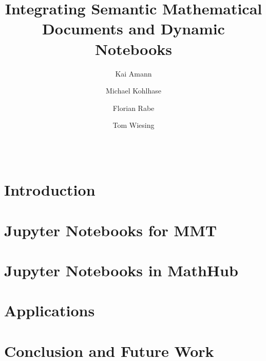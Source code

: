 \documentclass{llncs}
\title{Integrating Semantic Mathematical Documents and Dynamic Notebooks}
\author{Kai Amann \and Michael Kohlhase \and Florian Rabe \and Tom Wiesing}
\institute{Computer Science, FAU Erlangen-N\"urnberg}
\begin{document}
\maketitle
\begin{abstract}\strut\\\end{abstract}

\section{Introduction}\label{sec:intro}


\section{Jupyter Notebooks for MMT}\label{sec:mmt-jp}


\section{Jupyter Notebooks in MathHub}\label{sec:nb-mh}


\section{Applications}\label{sec:mitm-nb}


\section{Conclusion and Future Work}\label{sec:concl}


\printbibliography
\end{document}
